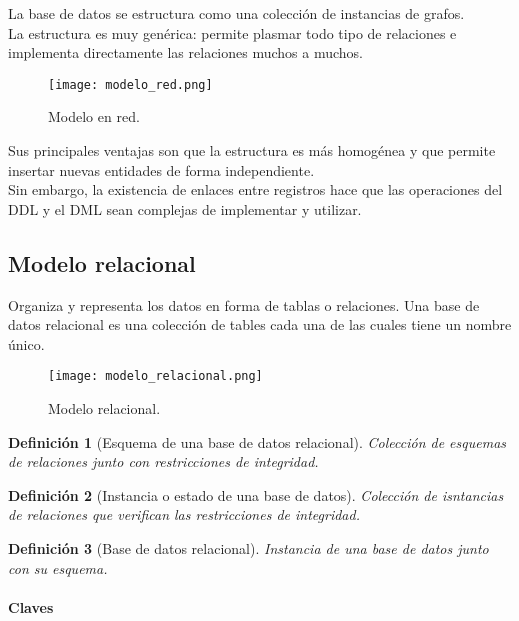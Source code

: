 \documentclass[12pt,spanish]{article}
\newtheorem{definition}{Definición}
\numberwithin{definition}{subsection}
\begin{document}
La base de datos se estructura como una colección de instancias de grafos.\\

La estructura es muy genérica: permite plasmar todo tipo de relaciones e implementa directamente las relaciones muchos a muchos.

\begin{figure}[H]
\centering
\texttt{[image: modelo\_red.png]}
\caption{Modelo en red.}
\end{figure}

Sus principales ventajas son que la estructura es más homogénea y que permite insertar nuevas entidades de forma independiente.\\
Sin embargo, la existencia de enlaces entre registros hace que las operaciones del DDL y el DML sean complejas de implementar y utilizar.

\subsection{Modelo relacional}


Organiza y representa los datos en forma de tablas o relaciones. Una base de datos relacional es una colección de tables cada una de las cuales tiene un nombre único.

\begin{figure}[H]
\centering
\texttt{[image: modelo\_relacional.png]}
\caption{Modelo relacional.}
\end{figure}

\begin{definition}[Esquema de una base de datos relacional]
	Colección de esquemas de relaciones junto con restricciones de integridad.
\end{definition}

\begin{definition}[Instancia o estado de una base de datos]
	Colección de isntancias de relaciones que verifican las restricciones de integridad.
\end{definition}

\begin{definition}[Base de datos relacional]
	Instancia de una base de datos junto con su esquema.
\end{definition}

\paragraph{Claves}
\end{document}
